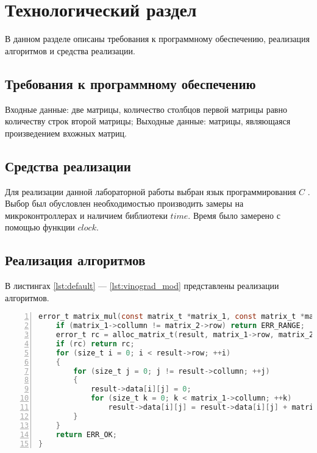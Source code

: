 \chapter{Технологический раздел}

В данном разделе описаны требования к программному обеспечению, реализация алгоритмов и средства реализации.

\section{Требования к программному обеспечению}

Входные данные: две матрицы, количество столбцов первой матрицы равно количеству строк второй матрицы;
Выходные данные: матрицы, являющаяся произведением вхожных матриц.


\section{Средства реализации}
Для реализации данной лабораторной работы выбран язык программирования $C$ \cite{C}. Выбор был обусловлен необходимостью производить замеры на микроконтроллерах и наличием библиотеки $time$\cite{C_date}. Время было замерено с помощью функции $clock$\cite{C_clock}.

\section{Реализация алгоритмов}
В листингах \ref{lst:default} --- \ref{lst:vinograd_mod} представлены реализации алгоритмов.

\begin{center}
\captionsetup{justification=raggedright,singlelinecheck=off}
\begin{lstlisting}[language=C, frame=single, numbers=left, label=lst:default, caption=Реализация классического алгоритма]
error_t matrix_mul(const matrix_t *matrix_1, const matrix_t *matrix_2, matrix_t *result) {
    if (matrix_1->collumn != matrix_2->row) return ERR_RANGE;
    error_t rc = alloc_matrix_t(result, matrix_1->row, matrix_2->collumn);
    if (rc) return rc;
    for (size_t i = 0; i < result->row; ++i)
    {
        for (size_t j = 0; j != result->collumn; ++j)
        {
            result->data[i][j] = 0;
            for (size_t k = 0; k < matrix_1->collumn; ++k)
                result->data[i][j] = result->data[i][j] + matrix_1->data[i][k] * matrix_2->data[k][j];
        }
    }
    return ERR_OK;
}\end{lstlisting}
\end{center}


